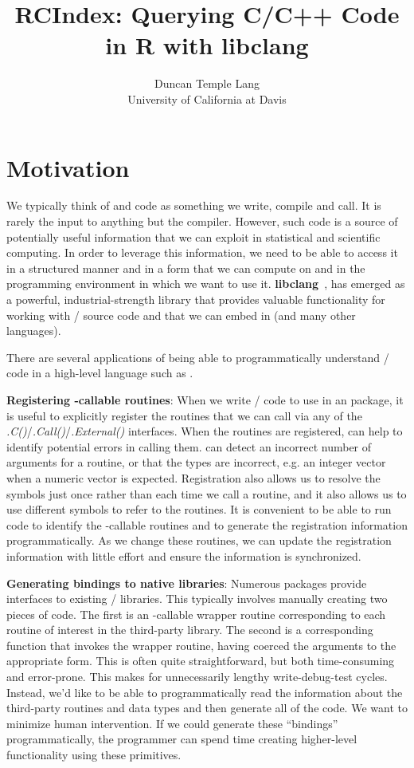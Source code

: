 \documentclass[article]{jss}
\author{Duncan Temple Lang\\University of California at Davis}
\title{RCIndex: Querying C/C++ Code in R with libclang}
\def\C{\proglang{C}}
\def\Cpp{\proglang{C$++$}}
\def\R{\proglang{R}}
\def\Rfunc#1{\textsl{#1()}}
\def\libclang{\textbf{libclang}}
\begin{document}

\section{Motivation}\label{sec:Introduction}

We typically think of \C{} and \Cpp{} code as something we write,
compile and call. It is rarely the input to anything but the compiler.
However, such code is a source of potentially useful information that
we can exploit in statistical and scientific computing.  In order to
leverage this information, we need to be able to access it in a
structured manner and in a form that we can compute on and in the
programming environment in which we want to use it.
\libclang{}~\cite{bib:libclang}, \cite{bib:libclangSlides} has
emerged as a powerful, industrial-strength library that provides
valuable functionality for working with \C/\Cpp{} source code and that
we can embed in \R{} (and many other languages).

There are several applications of being able to programmatically
understand \C/\Cpp{} code in a high-level language such as \R.

\textbf{Registering \R-callable routines}: When we write \C/\Cpp{} code
to use in an \R{} package, it is useful to explicitly register the
routines that we can call via any of the
\Rfunc{.C}/\Rfunc{.Call}/\Rfunc{.External} interfaces.  When the
routines are registered, \R{} can help to identify potential errors in
calling them.  \R{} can detect an incorrect number of arguments for a
routine, or that the types are incorrect, e.g. an integer vector when
a numeric vector is expected. Registration also allows us to resolve
the symbols just once rather than each time we call a routine, and it
also allows us to use different symbols to refer to the routines.  It
is convenient to be able to run \R{} code to identify the \R-callable
routines and to generate the registration information
programmatically.  As we change these routines, we can update the
registration information with little effort and ensure the information
is synchronized.


\textbf{Generating bindings to native libraries}: Numerous \R{}
packages provide interfaces to existing \C/\Cpp{} libraries.  This
typically involves manually creating two pieces of code. The first is
an \R-callable wrapper routine corresponding to each routine of
interest in the third-party library. The second is a corresponding
\R{} function that invokes the wrapper routine, having coerced the
\R{} arguments to the appropriate form.  This is often quite
straightforward, but both time-consuming and error-prone.  This makes
for unnecessarily lengthy write-debug-test cycles.  Instead, we'd like
to be able to programmatically read the information about the
third-party routines and data types and then generate all of the code.
We want to minimize human intervention.  If we could generate these
``bindings'' programmatically, the \R{} programmer can spend time
creating higher-level functionality using these primitives.
\end{document}
